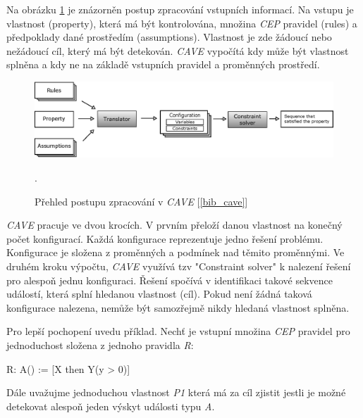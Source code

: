 \documentclass[
  digital, %
  table,   %
  nolof,     %
  nolot,     %
  oneside, %
  nocover,
  monochrome,
  12pt
]{fithesis3}
\begin{document}
Na obrázku \ref{fig:cave-concept} je znázorněn postup zpracování vstupních informací. Na vstupu je vlastnost (property), která má být kontrolována, množina \textit{CEP} pravidel (rules) a předpoklady dané prostředím (assumptions). Vlastnost je zde žádoucí nebo nežádoucí cíl, který má být detekován. \textit{CAVE} vypočítá kdy může být vlastnost splněna a kdy ne na základě vstupních pravidel a proměnných prostředí.

\begin{figure}[H]
	\centering
    \includegraphics[width=\textwidth, height=0.2\textheight]{images/cave-concept.eps}
    \caption{Přehled postupu zpracování v \textit{CAVE} [\ref{bib_cave}]}.
    \label{fig:cave-concept}
\end{figure}

\textit{CAVE} pracuje ve dvou krocích. V prvním přeloží danou vlastnost na konečný počet konfigurací. Každá konfigurace reprezentuje jedno řešení problému. Konfigurace je složena z proměnných a podmínek nad těmito proměnnými. Ve druhém kroku výpočtu, \textit{CAVE} využívá tzv "Constraint solver" k nalezení řešení pro alespoň jednu konfiguraci. Řešení spočívá v identifikaci takové sekvence událostí, která splní hledanou vlastnost (cíl). Pokud není žádná taková konfigurace nalezena, nemůže být samozřejmě nikdy hledaná vlastnost splněna.

Pro lepší pochopení uvedu příklad. Nechť je vstupní množina \textit{CEP} pravidel pro jednoduchost složena z jednoho pravidla \textit{R}:

\begin{center}
\begin{minipage}[H]{.5\linewidth}
	\begin{mylisting}
R:
A() := [X then Y(y > 0)]
	\end{mylisting}
	\label{fig:cave-event-example-1} 
\end{minipage}
\end{center}

Dále uvažujme jednoduchou vlastnost \textit{P1} která má za cíl zjistit jestli je možné detekovat alespoň jeden výskyt události typu \textit{A}.
\end{document}
